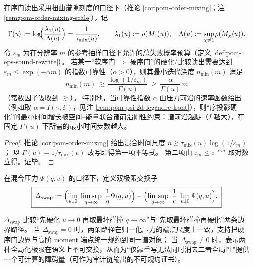 \begin{corollary}[压力前沿驱动的硬化时间下界（原型）]\label{cor:pom-pressure-delay-lower-bound}
在序门读出采用扭曲谱隙刻度的口径下（推论 \ref{cor:pom-order-mixing}；注 \ref{rem:pom-order-mixing-scale}），记
\[
\Gamma(u)
:=
\log\!\Bigl(\frac{\lambda_1(u)}{\Lambda(u)}\Bigr)
=\frac{1}{\tau_{\mathrm{mix}}(u)},
\qquad
\lambda_1(u):=\rho(M_1(u)),\quad
\Lambda(u):=\sup_{\chi\neq 1}\rho(M_\chi(u)).
\]
令 \(\varepsilon_m\) 为在分辨率 \(m\) 的参考抽样口径下允许的总失败概率预算（定义 \ref{def:pom-eps-sound-rewrite}）。
若某一“软序门 \(\Rightarrow\) 硬序门”的硬化/比较读出需要达到
\(
\varepsilon_m\le \exp(-\alpha m)
\)
的指数可靠性（\(\alpha>0\)），则其最小迭代深度 \(n_{\min}(m)\) 满足
\[
\boxed{\;
n_{\min}(m)\ \gtrsim\ \frac{\log(1/\varepsilon_m)}{\Gamma(u)}\ \ge\ \frac{\alpha}{\Gamma(u)}\,m\;}
\]
（常数因子吸收到 \(\gtrsim\)）。
特别地，当可靠性指数 \(\alpha\) 由压力前沿的速率函数给出（例如取 \(\alpha=I(\gamma,\mathcal{E})\)，见注 \ref{rem:pom-psi-2d-legendre-front}），则“序投影硬化”的最小时间增长被空间--能量联合谱前沿刚性约束：谱前沿越陡（\(I\) 越大），在固定 \(\Gamma(u)\) 下所需的最小时间步数越大。
\end{corollary}
\begin{proof}
推论 \ref{cor:pom-order-mixing} 给出混合时间尺度
\(
n\gtrsim \tau_{\mathrm{mix}}(u)\log(1/\varepsilon_m)
\)；
以 \(\Gamma(u)=1/\tau_{\mathrm{mix}}(u)\) 改写即得第一项不等式。
第二项由 \(\varepsilon_m\le e^{-\alpha m}\) 取对数立得。证毕。
\end{proof}

\begin{definition}\label{def:pom-hard-tail-swap-anomaly}
在混合压力 \(\Psi(q,u)\) 的口径下，定义双极限交换子
\[
\boxed{\;
\Delta_{\mathrm{swap}}
:=
\Bigl(\lim_{u\downarrow 0}\ \limsup_{q\to\infty}\ \frac{1}{q}\Psi(q,u)\Bigr)
-
\Bigl(\limsup_{q\to\infty}\ \frac{1}{q}\ \lim_{u\downarrow 0}\Psi(q,u)\Bigr).\;}
\]
\end{definition}

\begin{remark}\label{rem:pom-hard-tail-swap-anomaly}
\(\Delta_{\mathrm{swap}}\) 比较“先硬化 \(u\to 0\) 再取最坏碰撞 \(q\to\infty\)”与“先取最坏碰撞再硬化”两条边界路径。
当 \(\Delta_{\mathrm{swap}}=0\) 时，两条路径在归一化压力的端点尺度上一致，支持把硬序门边界与高阶 moment 端点统一规约到同一谱对象；
当 \(\Delta_{\mathrm{swap}}\neq 0\) 时，表示两种全局化极限在语义上不可交换，从而为“仅靠重写无法同时消去二者全局性”提供一个可计算的障碍量（可作为审计链输出的不可规约证书）。
\end{remark}

